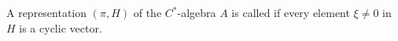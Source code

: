 A representation $(\pi, H)$ of the $C^*$-algebra $A$ is called  if every element $\xi \neq 0$ in $H$ is a cyclic vector.
